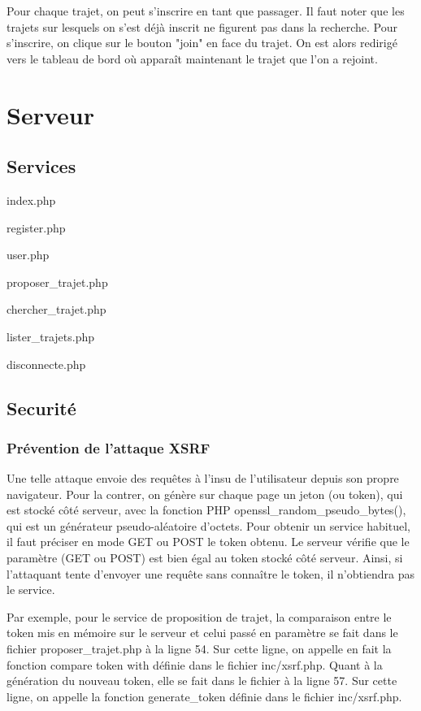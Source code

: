 \documentclass[a4paper]{article}
\begin{document}
Pour chaque trajet, on peut s'inscrire en tant que passager. Il faut noter que les trajets sur lesquels on s'est déjà inscrit ne figurent
pas dans la recherche. Pour s'inscrire, on clique sur le bouton "join" en face du trajet. On est alors redirigé vers le tableau de bord
où apparaît maintenant le trajet que l'on a rejoint.

\section{Serveur}

	\subsection{Services}
	
	index.php
	
	register.php
	
	user.php
	
	proposer\_trajet.php
	
	chercher\_trajet.php
	
	lister\_trajets.php
	
	disconnecte.php
	
	\subsection{Securité}
 		\subsubsection{Prévention de l'attaque XSRF}
 		
Une telle attaque envoie des requêtes à l'insu de l'utilisateur depuis son propre navigateur.
Pour la contrer, on génère sur chaque page un jeton (ou token), qui est stocké côté serveur, avec la fonction PHP 
openssl_random_pseudo_bytes(), qui est un générateur pseudo-aléatoire d'octets.
Pour obtenir un service habituel, il faut préciser en mode GET ou POST le token obtenu.
Le serveur vérifie que le paramètre (GET ou POST) est bien égal au token stocké côté serveur.
Ainsi, si l'attaquant tente d'envoyer une requête sans connaître le token, il n'obtiendra
pas le service.

Par exemple, pour le service de proposition de trajet, la comparaison entre le token mis en mémoire
sur le serveur et celui passé en paramètre se fait dans le fichier proposer\_trajet.php à la ligne
54. Sur cette ligne, on appelle en fait la fonction compare token with définie dans le fichier
inc/xsrf.php. Quant à la génération du nouveau token, elle se fait dans le fichier à la ligne 57. 
Sur cette ligne, on appelle la fonction generate\_token définie dans le 
fichier inc/xsrf.php.
 		
\end{document}

